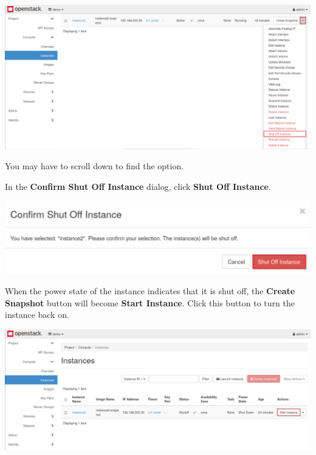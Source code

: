 \documentclass[letterpaper, 12pt]{article}
\begin{document}
\begin{enumerate}
\begin{labstep}
        \begin{center}
            \includegraphics[width=\linewidth]{images/part3/step12.png}
        \end{center}
    \end{labstep}

    \begin{notebox}
        You may have to scroll down to find the option.
    \end{notebox}

    \begin{labstep}
        In the \textbf{Confirm Shut Off Instance} dialog, click \textbf{Shut Off Instance}.

        \begin{center}
            \includegraphics[width=\linewidth]{images/part3/step13.png}
        \end{center}
    \end{labstep}

    \begin{labstep}
        When the power state of the instance indicates that it is shut off, the \textbf{Create Snapshot} button will become \textbf{Start Instance}.
        Click this button to turn the instance back on.

        \begin{center}
            \includegraphics[width=\linewidth]{images/part3/step14.png}
        \end{center}
    \end{labstep}


\end{enumerate}
\end{document}
